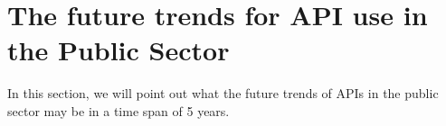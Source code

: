 \chapter{The future trends for API use in the Public Sector}

\ifpdf
    \graphicspath{{Chapter4/Figs/Raster/}{Chapter4/Figs/PDF/}{Chapter4/Figs/}}
\else
    \graphicspath{{Chapter4/Figs/Vector/}{Chapter4/Figs/}}
\fi

In this section, we will point out what the future trends of APIs in the public sector may be
in a time span of 5 years.

